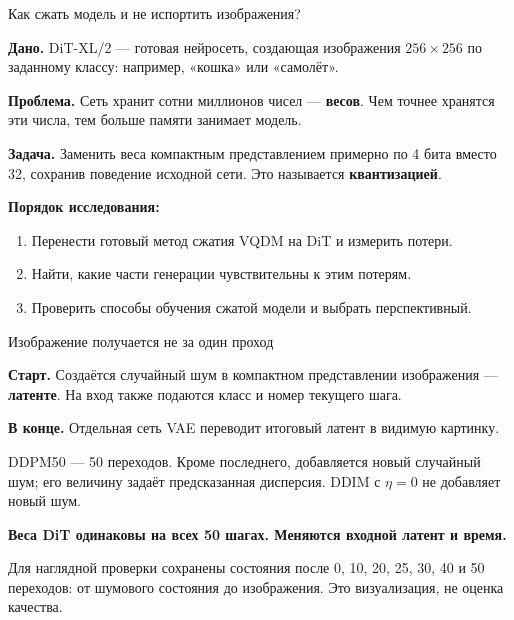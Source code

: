 \documentclass[aspectratio=1610,11pt]{beamer}
\renewcommand{\fact}[2]{\par\textcolor{Accent}{\textbf{#1.}} #2\par}
\newcommand{\finding}[1]{\par\vspace{.5mm}\textbf{#1}\par}
\newcommand{\detail}[1]{{\fontsize{10}{12}\selectfont #1\par}}
\newcommand{\tights}{\setlength{\itemsep}{1.5mm}\setlength{\parsep}{0pt}\setlength{\parskip}{0pt}}
\begin{document}
\begin{frame}[t]{Как сжать модель и не испортить изображения?}
  \fact{Дано}{DiT-XL/2 --- готовая нейросеть, создающая изображения
  $256\times256$ по заданному классу: например, «кошка» или «самолёт».}
  \fact{Проблема}{Сеть хранит сотни миллионов чисел --- \textbf{весов}.
  Чем точнее хранятся эти числа, тем больше памяти занимает модель.}
  \fact{Задача}{Заменить веса компактным представлением примерно по 4 бита
  вместо 32, сохранив поведение исходной сети. Это называется \textbf{квантизацией}.}
  \vspace{3mm}
  \textbf{Порядок исследования:}
  \begin{enumerate}\tights
    \item Перенести готовый метод сжатия VQDM на DiT и измерить потери.
    \item Найти, какие части генерации чувствительны к этим потерям.
    \item Проверить способы обучения сжатой модели и выбрать перспективный.
  \end{enumerate}
\end{frame}

\begin{frame}[t]{Изображение получается не за один проход}
  \fact{Старт}{Создаётся случайный шум в компактном представлении изображения
  --- \textbf{латенте}. На вход также подаются класс и номер текущего шага.}
  \begin{center}
  \end{center}
  \fact{В конце}{Отдельная сеть VAE переводит итоговый латент в видимую картинку.}
  \detail{DDPM50 --- 50 переходов. Кроме последнего, добавляется новый случайный шум;
  его величину задаёт предсказанная дисперсия. DDIM с $\eta=0$ не добавляет новый шум.}
  \finding{Веса DiT одинаковы на всех 50 шагах. Меняются входной латент и время.}
  \detail{Для наглядной проверки сохранены состояния после 0, 10, 20, 25, 30, 40 и 50 переходов:
  от шумового состояния до изображения. Это визуализация, не оценка качества.}
\end{frame}
\end{document}
